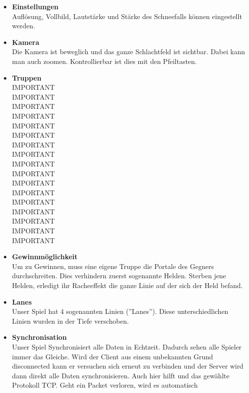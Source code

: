 \begin{itemize}
\begin{itemize}
        \end{itemize}
    \item \textbf{Einstellungen} \\
        Auflösung, Vollbild, Lautstärke und Stärke des Schneefalls können eingestellt werden.
    \item \textbf{Kamera} \\
        Die Kamera ist beweglich und das ganze Schlachtfeld ist sichtbar. Dabei kann man auch zoomen. Kontrollierbar ist dies mit den Pfeiltasten.
    \item \textbf{Truppen} \\
        IMPORTANT\\
        IMPORTANT\\
        IMPORTANT\\
        IMPORTANT\\
        IMPORTANT\\
        IMPORTANT\\
        IMPORTANT\\
        IMPORTANT\\
        IMPORTANT\\
        IMPORTANT\\
        IMPORTANT\\
        IMPORTANT\\
        IMPORTANT\\
        IMPORTANT\\
        IMPORTANT\\
        IMPORTANT\\
        IMPORTANT\\
    \item \textbf{Gewinnmöglichkeit} \\
        Um zu Gewinnen, muss eine eigene Truppe die Portale des Gegners durchschreiten. Dies verhindern zuerst sogenannte Helden. Sterben jene Helden, erledigt ihr Racheeffekt die
        ganze Linie auf der sich der Held befand.
    \item \textbf{Lanes} \\
        Unser Spiel hat 4 sogenannten Linien (''Lanes''). Diese unterschiedlichen Linien wurden in der Tiefe verschoben.
    \item \textbf{Synchronisation} \\
        Unser Spiel Synchronisiert alle Daten in Echtzeit. Dadurch sehen alle Spieler immer das Gleiche. Wird der Client aus einem unbekannten Grund disconnected kann er versuchen
        sich erneut zu verbinden und der Server wird dann direkt alle Daten synchronisieren. Auch hier hilft und das gewählte Protokoll TCP. Geht ein Packet verloren, wird es automatisch

\end{itemize}

